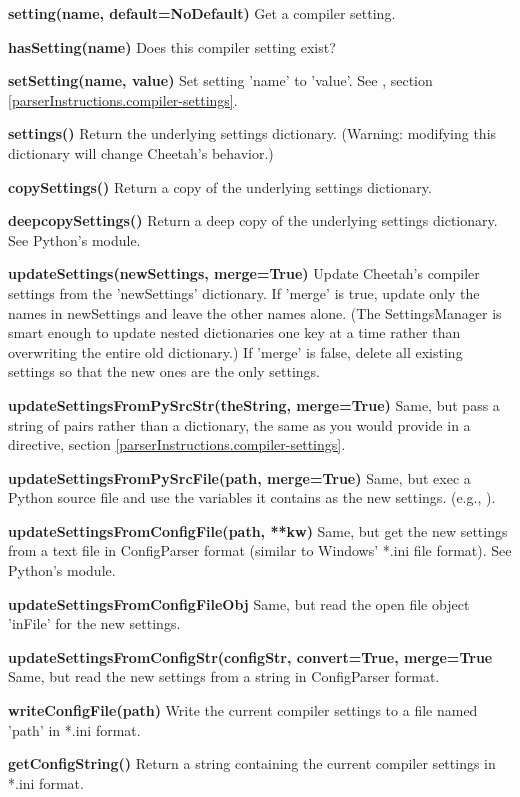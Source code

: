 \begin{description}
\item{{\bf setting(name, default=NoDefault)}}  Get a compiler setting.
\item{{\bf hasSetting(name)}}  Does this compiler setting exist?
\item{{\bf setSetting(name, value)}}  Set setting 'name' to 'value'.
    See , section 
    \ref{parserInstructions.compiler-settings}.
\item{{\bf settings()}}  Return the underlying settings dictionary.  (Warning:
    modifying this dictionary will change Cheetah's behavior.)
\item{{\bf copySettings()}}  Return a copy of the underlying settings
    dictionary.
\item{{\bf deepcopySettings()}}  Return a deep copy of the underlying settings
    dictionary.  See Python's  module.
\item{{\bf updateSettings(newSettings, merge=True)}}  Update Cheetah's 
    compiler settings from the 'newSettings' dictionary.  If 'merge' is true,
    update only the names in newSettings and leave the other names alone.
    (The SettingsManager is smart enough to update nested dictionaries one
    key at a time rather than overwriting the entire old dictionary.)
    If 'merge' is false, delete all existing settings so that the new ones are
    the only settings.
\item{{\bf updateSettingsFromPySrcStr(theString, merge=True)}}  Same, 
    but pass a string of  pairs rather
    than a dictionary, the same as you would provide in a
     directive, section
    \ref{parserInstructions.compiler-settings}.
\item{{\bf updateSettingsFromPySrcFile(path, merge=True)}}  Same, but
    exec a Python source file and use the variables it contains as the new
    settings.  (e.g., ).
\item{{\bf updateSettingsFromConfigFile(path, **kw)}}  Same, but get the new
    settings from a text file in ConfigParser format (similar to Windows'
    *.ini file format).  See Python's  module.
\item{{\bf updateSettingsFromConfigFileObj}}  Same, but read the open file
    object 'inFile' for the new settings.  
\item{{\bf updateSettingsFromConfigStr(configStr, convert=True, merge=True}}
    Same, but read the new settings from a string in ConfigParser format.
\item{{\bf writeConfigFile(path)}}  Write the current compiler settings to
    a file named 'path' in *.ini format.
\item{{\bf getConfigString()}}  Return a string containing the current
    compiler settings in *.ini format.
\end{description}

